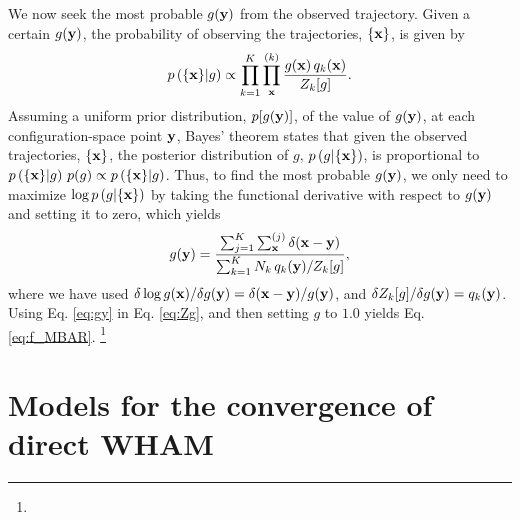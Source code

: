 \documentclass[reprint,aip,jcp,superscriptaddress]{revtex4-1}
\begin{document}
We now seek the most probable $g(\mathbf{y})$
from the observed trajectory.
%
Given a certain $g(\mathbf{y})$,
the probability of observing the trajectories,
$\{ \mathbf{x} \}$,
is given by
%
\begin{equation*}
p\left( \{ \mathbf{x} \} | g \right)
\propto
\prod_{k = 1}^K
\prod_{\mathbf{x}}^{(k)}
\frac{ g(\mathbf{x}) \, q_k(\mathbf{x}) }
     { Z_k[g] }.
\end{equation*}
%
Assuming a uniform prior distribution,
$p[g(\mathbf{y})]$, of the value of $g(\mathbf{y})$,
at each configuration-space point $\mathbf{y}$,
Bayes' theorem\cite{leonard} states that
given the observed trajectories, $\{\mathbf{x}\}$,
the posterior distribution of $g$,
$p\left( g | \{ \mathbf{x} \} \right)$,
is proportional to
$p\left( \{ \mathbf{x} \} | g \right) \, p(g) \propto p\left( \{ \mathbf{x} \} | g \right)$.
%
Thus,
to find the most probable $g(\mathbf{y})$,
we only need to maximize
$\log p\left( g | \{ \mathbf{x} \} \right)$
by taking the functional derivative
with respect to $g(\mathbf{y})$
and setting it to zero,
which yields
%
\begin{equation}
g(\mathbf{y})
=
\frac{
  \sum_{j = 1}^K \sum_{\mathbf{x}}^{(j)} \delta(\mathbf{x} - \mathbf{y})
}
{
  \sum_{k = 1}^K N_k \, q_k(\mathbf{y}) / Z_k[g]
},
\label{eq:gy}
\end{equation}
%
where we have used
$\delta \log g(\mathbf{x}) / \delta g(\mathbf{y}) = \delta(\mathbf{x} - \mathbf{y})/g(\mathbf{y})$,
and
$\delta Z_k[g] / \delta g(\mathbf{y}) = q_k(\mathbf{y})$.
%
Using Eq. \eqref{eq:gy}
in Eq. \eqref{eq:Zg},
and then setting $g$ to $1.0$
yields Eq. \eqref{eq:f_MBAR}.
%
\footnote{}




\section{\label{sec:convwham}
Models for the convergence of direct WHAM}



\end{document}
